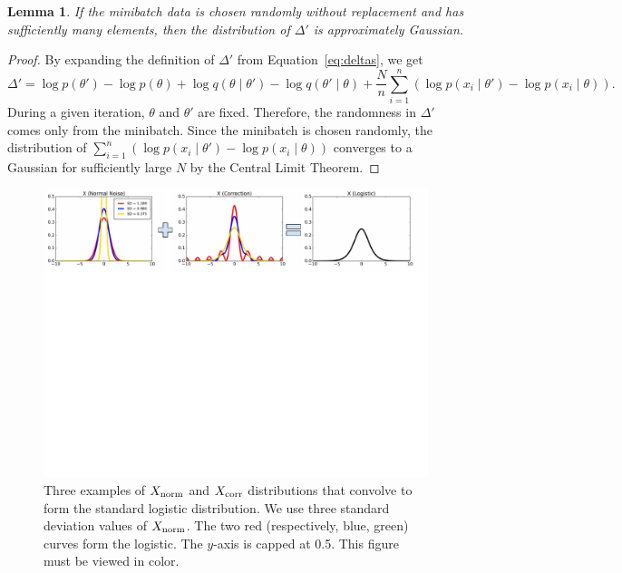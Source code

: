 \documentclass{article}
\newtheorem{lemma}{Lemma}
\begin{document}
\begin{lemma}\label{lem:gaussian}
If the minibatch data is chosen randomly without replacement and has sufficiently many elements,
then the distribution of $\Delta'$ is approximately Gaussian.
\end{lemma}

\begin{proof}
By expanding the definition of $\Delta'$ from Equation~\ref{eq:deltas}, we get
\[
\Delta' = \log p(\theta') - \log p(\theta) + \log q(\theta \mid \theta') - \log q(\theta' \mid \theta) +
\frac{N}{n}\sum_{i=1}^n (\log p(x_i\mid \theta') - \log p(x_i\mid \theta)).
\]
During a given iteration, $\theta$ and $\theta'$ are fixed. Therefore, the randomness in $\Delta'$
comes only from the minibatch. Since the minibatch is chosen randomly, the distribution of
$\sum_{i=1}^n (\log p(x_i\mid \theta') - \log p(x_i\mid \theta))$ converges to a Gaussian for
sufficiently large $N$ by the Central Limit Theorem.
\end{proof}

\begin{figure}[t]
    \centering
    \includegraphics[width=1\textwidth]{mh_convolution_diagram_v2}
    \caption{
    Three examples of $X_{\rm norm}$ and $X_{\rm corr}$ distributions that convolve to form the
    standard logistic distribution. We use three standard deviation values of $X_{\rm norm}$. The
    two red (respectively, blue, green) curves form the logistic. The $y$-axis is capped at 0.5.
    This figure must be viewed in color.
    }
    \label{fig:deconvolution}
\end{figure}
\end{document}
